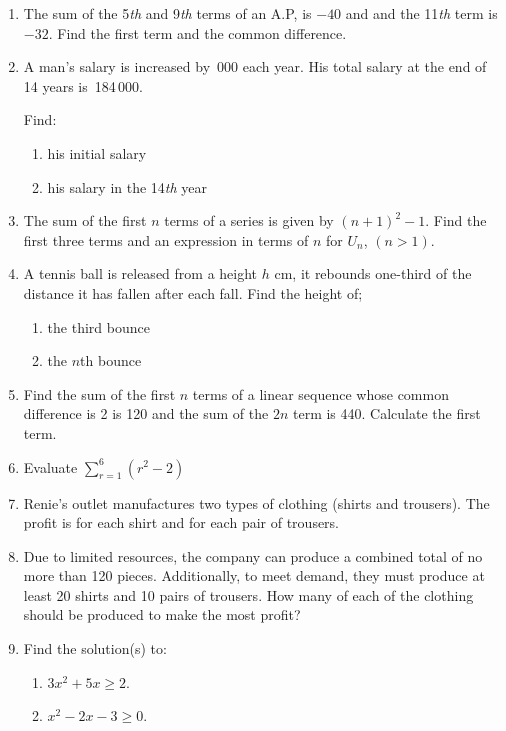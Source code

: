 \begin{enumerate}
\item The sum of the 5\textit{th} and 9\textit{th} terms of an A.P, is $-40$ and and the
11\textit{th} term is $-32$. Find the first term and the common difference.

\item A man's salary is increased by \,000 each year. His total salary at
the end of 14 years is \,184\,000.

Find:
\begin{enumerate}
  \item[a.] his initial salary
  \item[b.] his salary in the 14\textit{th} year
\end{enumerate}

\item The sum of the first $n$ terms of a series is given by $(n + 1)^2 - 1$. Find the
first three terms and an expression in terms of $n$ for $U_n$, $(n > 1)$.

\item A tennis ball is released from a height $h$ cm, it rebounds one-third of the
distance it has fallen after each fall. Find the height of;
\begin{enumerate}
  \item[a.] the third bounce
  \item[b.] the $n$th bounce
\end{enumerate}

\item Find the sum of the first $n$ terms of a linear sequence whose common
difference is 2 is 120 and the sum of the $2n$ term is 440. Calculate the first
term.

\item Evaluate $\sum_{r=1}^{6} (r^2 - 2)$

\item Renie's outlet manufactures two types of clothing (shirts and trousers).
The profit is  for each shirt and  for each pair of
trousers.

\item Due to limited resources, the company can produce a combined total of no
more than 120 pieces. Additionally, to meet demand, they must produce at
least 20 shirts and 10 pairs of trousers. How many of each of the clothing
should be produced to make the most profit?

\item Find the solution(s) to:
\begin{enumerate}
  \item[a.] $3x^2 + 5x \ge 2$.
  \item[b.] $x^2 - 2x - 3 \ge 0$.
\end{enumerate}


\end{enumerate}
